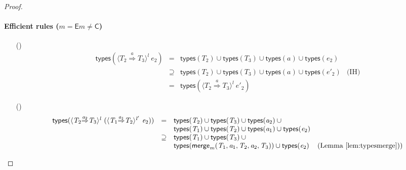 \documentclass[9pt]{extarticle}
\newcommand{\ottnt}[1]{\mathit{#1}}
\newcommand{\ottsym}[1]{#1}
\begin{document}
\begin{lemma}
\begin{proof}
{    \paragraph{Efficient \lambdah rules (\ifpopl$\ottnt{m}  \ottsym{=}   \mathsf{E} $\else$\ottnt{m}  \neq   \mathsf{C} $\fi)}
\begin{itemize}
    \item[(\ECastInner)]  \[ \begin{array}{rclr}
         \mathsf{types} (  \langle  \ottnt{T_{{\mathrm{2}}}}  \mathord{ \overset{ \ottnt{a} }{\Rightarrow} }  \ottnt{T_{{\mathrm{3}}}}  \rangle^{ \ottnt{l} } ~  \ottnt{e_{{\mathrm{2}}}}  )  &=& 
            \mathsf{types} ( \ottnt{T_{{\mathrm{2}}}} )   \cup   \mathsf{types} ( \ottnt{T_{{\mathrm{3}}}} )    \cup   \mathsf{types} ( \ottnt{a} )    \cup   \mathsf{types} ( \ottnt{e_{{\mathrm{2}}}} )   & \\
        &\supseteq&     \mathsf{types} ( \ottnt{T_{{\mathrm{2}}}} )   \cup   \mathsf{types} ( \ottnt{T_{{\mathrm{3}}}} )    \cup   \mathsf{types} ( \ottnt{a} )    \cup   \mathsf{types} ( \ottnt{e'_{{\mathrm{2}}}} )   & \text{(IH)} \\
        &=&  \mathsf{types} (  \langle  \ottnt{T_{{\mathrm{2}}}}  \mathord{ \overset{ \ottnt{a} }{\Rightarrow} }  \ottnt{T_{{\mathrm{3}}}}  \rangle^{ \ottnt{l} } ~  \ottnt{e'_{{\mathrm{2}}}}  ) 
      \end{array} \]
    \item[(\ECastMerge)]  \[ \begin{array}{rclr}
         \mathsf{types} (  \langle  \ottnt{T_{{\mathrm{2}}}}  \mathord{ \overset{ \ottnt{a_{{\mathrm{2}}}} }{\Rightarrow} }  \ottnt{T_{{\mathrm{3}}}}  \rangle^{ \ottnt{l} } ~   (  \langle  \ottnt{T_{{\mathrm{1}}}}  \mathord{ \overset{ \ottnt{a_{{\mathrm{1}}}} }{\Rightarrow} }  \ottnt{T_{{\mathrm{2}}}}  \rangle^{ \ottnt{l'} } ~  \ottnt{e_{{\mathrm{2}}}}  )   )  &=& 
               \mathsf{types} ( \ottnt{T_{{\mathrm{2}}}} )   \cup   \mathsf{types} ( \ottnt{T_{{\mathrm{3}}}} )    \cup   \mathsf{types} ( \ottnt{a_{{\mathrm{2}}}} )    \cup  {} \\  &  &   \mathsf{types} ( \ottnt{T_{{\mathrm{1}}}} )    \cup   \mathsf{types} ( \ottnt{T_{{\mathrm{2}}}} )    \cup   \mathsf{types} ( \ottnt{a_{{\mathrm{1}}}} )    \cup   \mathsf{types} ( \ottnt{e_{{\mathrm{2}}}} )   & \\
        &\supseteq&     \mathsf{types} ( \ottnt{T_{{\mathrm{1}}}} )   \cup   \mathsf{types} ( \ottnt{T_{{\mathrm{3}}}} )    \cup  {} \\  &  &   \mathsf{types} (  \mathsf{merge} _{ \ottnt{m} }( \ottnt{T_{{\mathrm{1}}}} , \ottnt{a_{{\mathrm{1}}}} , \ottnt{T_{{\mathrm{2}}}} , \ottnt{a_{{\mathrm{2}}}} , \ottnt{T_{{\mathrm{3}}}} )  )    \cup   \mathsf{types} ( \ottnt{e_{{\mathrm{2}}}} )   & \text{(Lemma~\ref{lem:typesmerge}))}\\

\end{array}\]
\end{itemize}}
\end{proof}
\end{lemma}
\end{document}
